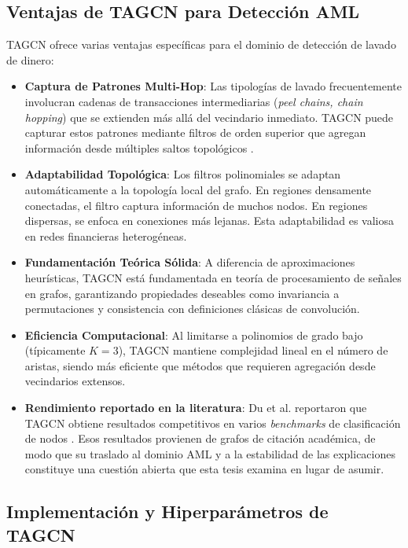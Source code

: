 \subsection{Ventajas de TAGCN para Detección AML}

TAGCN ofrece varias ventajas específicas para el dominio de detección de lavado de dinero:

\begin{itemize}
    \item \textbf{Captura de Patrones Multi-Hop}: Las tipologías de lavado frecuentemente involucran cadenas de transacciones intermediarias (\textit{peel chains, chain hopping}) que se extienden más allá del vecindario inmediato. TAGCN puede capturar estos patrones mediante filtros de orden superior que agregan información desde múltiples saltos topológicos \cite{Du2017TopologyNetworks}.
    \item \textbf{Adaptabilidad Topológica}: Los filtros polinomiales se adaptan automáticamente a la topología local del grafo. En regiones densamente conectadas, el filtro captura información de muchos nodos. En regiones dispersas, se enfoca en conexiones más lejanas. Esta adaptabilidad es valiosa en redes financieras heterogéneas.
    \item \textbf{Fundamentación Teórica Sólida}: A diferencia de aproximaciones heurísticas, TAGCN está fundamentada en teoría de procesamiento de señales en grafos, garantizando propiedades deseables como invariancia a permutaciones y consistencia con definiciones clásicas de convolución.
    \item \textbf{Eficiencia Computacional}: Al limitarse a polinomios de grado bajo (típicamente $K=3$), TAGCN mantiene complejidad lineal en el número de aristas, siendo más eficiente que métodos que requieren agregación desde vecindarios extensos.
    \item \textbf{Rendimiento reportado en la literatura}: Du et al. reportaron que TAGCN obtiene resultados competitivos en varios \textit{benchmarks} de clasificación de nodos \cite{Du2017TopologyNetworks}. Esos resultados provienen de grafos de citación académica, de modo que su traslado al dominio AML y a la estabilidad de las explicaciones constituye una cuestión abierta que esta tesis examina en lugar de asumir.
\end{itemize}

\subsection{Implementación y Hiperparámetros de TAGCN}

